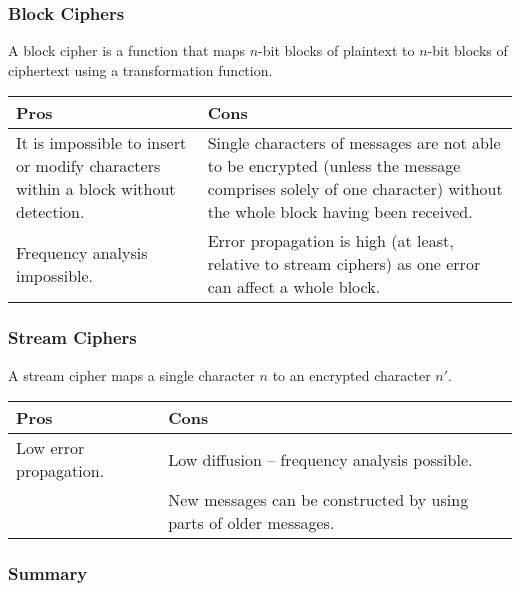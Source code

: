     \subsubsection{Block Ciphers}
    
    A block cipher is a function that maps $n$-bit blocks of plaintext to $n$-bit blocks of ciphertext using a transformation function. 
    
    \begin{center}
       \begin{tabular}{ | p{6cm} | p{6cm} |}
          \hline
          Pros & Cons \\ \hline \hline
          It is impossible to insert or modify characters within a block without detection. & Single characters of messages are not able to be encrypted (unless the message comprises solely of one character) without the whole block having been received. \\ \hline
          Frequency analysis impossible. & Error propagation is high (at least, relative to stream ciphers) as one error can affect a whole block. \\
          \hline
        \end{tabular}
      \end{center}
    
    \subsubsection{Stream Ciphers}
    
    A stream cipher maps a single character $n$ to an encrypted character $n'$.
    
    \begin{center}
       \begin{tabular}{ | p{6cm} | p{6cm} |}
          \hline
          Pros & Cons \\ \hline \hline
          Low error propagation. & Low diffusion -- frequency analysis possible. \\ \hline
          & New messages can be constructed by using parts of older messages. \\ 
          \hline
        \end{tabular}
      \end{center}
    
    \subsubsection{Summary}

